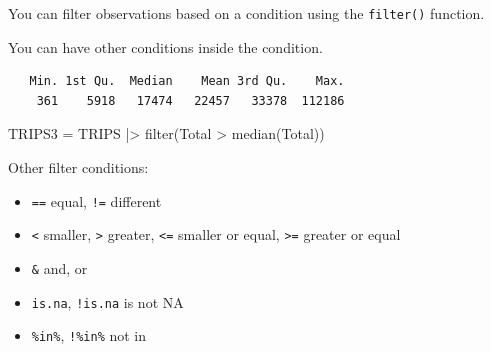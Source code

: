 \documentclass[
  letterpaper,
  DIV=11,
  numbers=noendperiod]{scrreprt}
\newenvironment{Shaded}{\begin{snugshade}}{\end{snugshade}}
\newcommand{\CommentTok}[1]{\textcolor[rgb]{0.37,0.37,0.37}{#1}}
\newcommand{\DecValTok}[1]{\textcolor[rgb]{0.68,0.00,0.00}{#1}}
\newcommand{\FunctionTok}[1]{\textcolor[rgb]{0.28,0.35,0.67}{#1}}
\newcommand{\NormalTok}[1]{\textcolor[rgb]{0.00,0.23,0.31}{#1}}
\newcommand{\OtherTok}[1]{\textcolor[rgb]{0.00,0.23,0.31}{#1}}
\newcommand{\SpecialCharTok}[1]{\textcolor[rgb]{0.37,0.37,0.37}{#1}}
\providecommand{\tightlist}{%
  \setlength{\itemsep}{0pt}\setlength{\parskip}{0pt}}\usepackage{longtable,booktabs,array}
\begin{document}
You can filter observations based on a condition using the
\texttt{filter()} function.

\begin{Shaded}
\end{Shaded}

You can have other conditions inside the condition.

\begin{Shaded}
\end{Shaded}

\begin{verbatim}
   Min. 1st Qu.  Median    Mean 3rd Qu.    Max. 
    361    5918   17474   22457   33378  112186 
\end{verbatim}

\begin{Shaded}
\begin{Highlighting}[]
\NormalTok{TRIPS3 }\OtherTok{=}\NormalTok{ TRIPS }\SpecialCharTok{|\textgreater{}} \FunctionTok{filter}\NormalTok{(Total }\SpecialCharTok{\textgreater{}} \FunctionTok{median}\NormalTok{(Total)) }
\end{Highlighting}
\end{Shaded}

Other filter conditions:

\begin{itemize}
\tightlist
\item
  \texttt{==} equal, \texttt{!=} different
\item
  \texttt{\textless{}} smaller, \texttt{\textgreater{}} greater,
  \texttt{\textless{}=} smaller or equal, \texttt{\textgreater{}=}
  greater or equal
\item
  \texttt{\&} and, \texttt{\textbar{}} or
\item
  \texttt{is.na}, \texttt{!is.na} is not NA
\item
  \texttt{\%in\%}, \texttt{!\%in\%} not in
\end{itemize}
\end{document}
